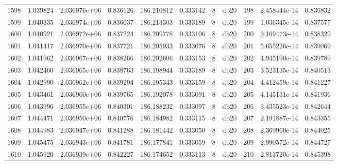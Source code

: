 \begin{tabular}{lrrrrrrlrrr}
1598 &    1.039824 &        2.036976e+06 &  0.836126 &              186.216812 &    0.333142 &       8 &         db20 &    198 &   2.458444e-14 &      0.836832 \\
1599 &    1.040335 &        2.036974e+06 &  0.836637 &              186.213303 &    0.333189 &       8 &         db20 &    199 &   1.036345e-14 &      0.837577 \\
1600 &    1.040921 &        2.036972e+06 &  0.837224 &              186.209778 &    0.333106 &       8 &         db20 &    200 &   3.169473e-14 &      0.838329 \\
1601 &    1.041417 &        2.036970e+06 &  0.837721 &              186.205933 &    0.333076 &       8 &         db20 &    201 &   5.655226e-14 &      0.839069 \\
1602 &    1.041962 &        2.036967e+06 &  0.838266 &              186.202606 &    0.333153 &       8 &         db20 &    202 &   4.945190e-14 &      0.839789 \\
1603 &    1.042460 &        2.036965e+06 &  0.838763 &              186.198944 &    0.333189 &       8 &         db20 &    203 &   3.523135e-14 &      0.840513 \\
1604 &    1.042990 &        2.036962e+06 &  0.839294 &              186.195343 &    0.333159 &       8 &         db20 &    204 &   4.412459e-14 &      0.841227 \\
1605 &    1.043461 &        2.036960e+06 &  0.839765 &              186.192078 &    0.333091 &       8 &         db20 &    205 &   4.145131e-14 &      0.841936 \\
1606 &    1.043996 &        2.036955e+06 &  0.840301 &              186.188232 &    0.333097 &       8 &         db20 &    206 &   3.435523e-14 &      0.842644 \\
1607 &    1.044471 &        2.036950e+06 &  0.840776 &              186.184982 &    0.333115 &       8 &         db20 &    207 &   2.191887e-14 &      0.843355 \\
1608 &    1.044983 &        2.036947e+06 &  0.841288 &              186.181442 &    0.333050 &       8 &         db20 &    208 &   2.369960e-14 &      0.844025 \\
1609 &    1.045475 &        2.036943e+06 &  0.841781 &              186.177841 &    0.333059 &       8 &         db20 &    209 &   2.990572e-14 &      0.844727 \\
1610 &    1.045920 &        2.036939e+06 &  0.842227 &              186.174652 &    0.333113 &       8 &         db20 &    210 &   2.813720e-14 &      0.845398 \\

\end{tabular}
